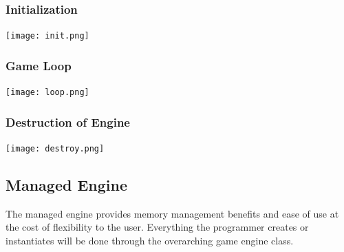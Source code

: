 \documentclass[12pt]{article}
\begin{document}
\subsubsection{Initialization}
\texttt{[image: init.png]}

\subsubsection{Game Loop}
\texttt{[image: loop.png]}

\subsubsection{Destruction of Engine}
\texttt{[image: destroy.png]}

\subsection{Managed Engine}
The managed engine provides memory management benefits and ease of use at the cost of flexibility to the user. Everything the programmer creates or instantiates will be done through the overarching game engine class.
\end{document}
